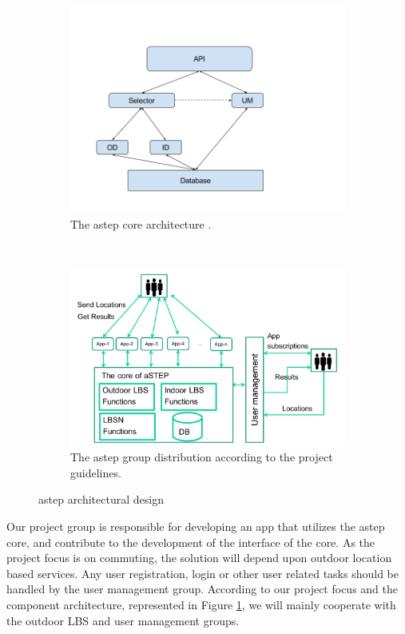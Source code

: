 \begin{figure}[h!]
	\centering
	\begin{subfigure}[b]{0.48\textwidth}
		\includegraphics[width=\textwidth]{figures/InformalArchitecture.png}
		\caption{The \gls{astep} core architecture \cite{astepArchitectureImage}. }
		\label{fig:astepCore}
	\end{subfigure}
	~ %
	\begin{subfigure}[b]{0.48\textwidth}
		\includegraphics[width=\textwidth]{figures/astepGroups.png}
		\caption{The \gls{astep} group distribution according to the project guidelines.}
		\label{fig:astepGroups}
	\end{subfigure}
	\caption{\gls{astep} architectural design}
	\label{fig:astepArchitecture}
\end{figure}


Our project group is responsible for developing an app that utilizes the \gls{astep} core, and contribute to the development of the interface of the core.
As the project focus is on commuting, the solution will depend upon outdoor location based services.
Any user registration, login or other user related tasks should be handled by the user management group.
According to our project focus and the component architecture, represented in Figure \ref{fig:astepCore}, we will mainly cooperate with the outdoor LBS and user management groups.